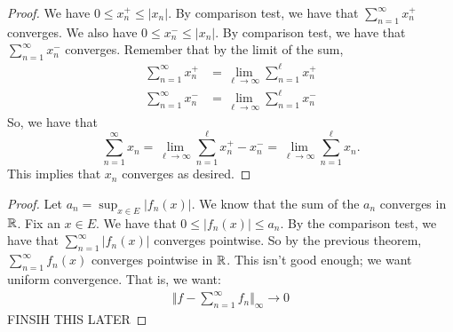 \documentclass{report}
\begin{document}
\newpage
{}
\begin{proof}
    We have $0 \leq x_n^+ \leq |x_n|$. By comparison test, we have that $\sum_{n=1}^\infty x_n^+$ converges. We also have $0 \leq x_n^- \leq |x_n|$. By comparison test, we have that $\sum_{n=1}^\infty x_n^-$ converges. Remember that by the limit of the sum,
    \begin{align*}
        \sum_{n=1}^\infty x_n^+ &= \lim_{\ell \to \infty}\sum_{n=1}^\ell x_n^+ \\
        \sum_{n=1}^\infty x_n^- &= \lim_{\ell \to \infty}\sum_{n=1}^\ell x_n^-
    \end{align*}
    So, we have that $$\sum_{n=1}^\infty x_n = 
    \lim_{\ell \to \infty}\sum_{n=1}^\ell x_n^+ -  x_n^- = \lim_{\ell \to \infty} \sum_{n=1}^\ell x_n.$$
    This implies that $x_n$ converges as desired.
\end{proof}
\begin{proof}
    Let $a_n = \sup_{x \in E}|f_n(x)|$. We know that the sum of the $a_n$ converges in $\RR$. Fix an $x \in E$. We have that $0 \leq |f_n(x)| \leq a_n$. By the comparison test, we have that $\sum_{n=1}^\infty |f_n(x)|$ converges pointwise. So by the previous theorem, $\sum_{n=1}^\infty f_n(x)$ converges pointwise in $\RR$. This isn't good enough; we want uniform convergence. That is, we want:
    \begin{align*}
        \Vert f - \sum_{n = 1}^\infty f_n \Vert_\infty \to 0
    \end{align*}
    FINSIH THIS LATER
\end{proof}
\end{document}
